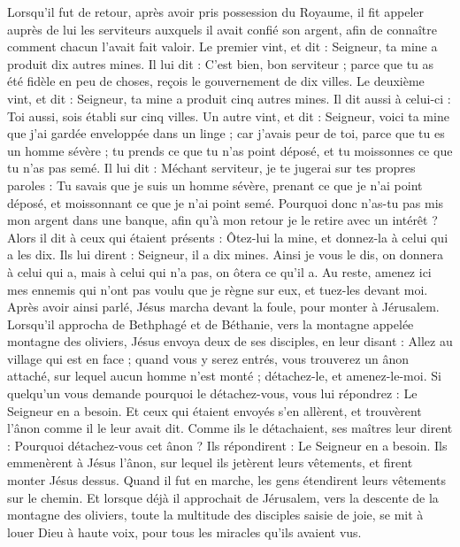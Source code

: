 \begin{multicols}{2}
{Lorsqu’il fut de retour, après avoir pris possession du Royaume, il fit appeler auprès de lui les serviteurs auxquels il avait confié son argent, afin de connaître comment chacun l’avait fait valoir.
Le premier vint, et dit : Seigneur, ta mine a produit dix autres mines.
Il lui dit : C’est bien, bon serviteur ; parce que tu as été fidèle en peu de choses, reçois le gouvernement de dix villes.
Le deuxième vint, et dit : Seigneur, ta mine a produit cinq autres mines.
Il dit aussi à celui-ci : Toi aussi, sois établi sur cinq villes.
Un autre vint, et dit : Seigneur, voici ta mine que j'ai gardée enveloppée dans un linge ;
car j’avais peur de toi, parce que tu es un homme sévère ; tu prends ce que tu n'as point déposé, et tu moissonnes ce que tu n'as pas semé.
Il lui dit : Méchant serviteur, je te jugerai sur tes propres paroles : Tu savais que je suis un homme sévère, prenant ce que je n'ai point déposé, et moissonnant ce que je n'ai point semé.
Pourquoi donc n'as-tu pas mis mon argent dans une banque, afin qu’à mon retour je le retire avec un intérêt ?
Alors il dit à ceux qui étaient présents : Ôtez-lui la mine, et donnez-la à celui qui a les dix.
Ils lui dirent : Seigneur, il a dix mines.
Ainsi je vous le dis, on donnera à celui qui a, mais à celui qui n’a pas, on ôtera ce qu’il a.
Au reste, amenez ici mes ennemis qui n'ont pas voulu que je règne sur eux, et tuez-les devant moi.
Après avoir ainsi parlé, Jésus marcha devant la foule, pour monter à Jérusalem.
Lorsqu’il approcha de Bethphagé et de Béthanie, vers la montagne appelée montagne des oliviers, Jésus envoya deux de ses disciples,
en leur disant : Allez au village qui est en face ; quand vous y serez entrés, vous trouverez un ânon attaché, sur lequel aucun homme n'est monté ; détachez-le, et amenez-le-moi.
Si quelqu'un vous demande pourquoi le détachez-vous, vous lui répondrez : Le Seigneur en a besoin.
Et ceux qui étaient envoyés s'en allèrent, et trouvèrent l'ânon comme il le leur avait dit.
Comme ils le détachaient, ses maîtres leur dirent : Pourquoi détachez-vous cet ânon ?
Ils répondirent : Le Seigneur en a besoin.
Ils emmenèrent à Jésus l'ânon, sur lequel ils jetèrent leurs vêtements, et firent monter Jésus dessus.
Quand il fut en marche, les gens étendirent leurs vêtements sur le chemin.
Et lorsque déjà il approchait de Jérusalem, vers la descente de la montagne des oliviers, toute la multitude des disciples saisie de joie, se mit à louer Dieu à haute voix, pour tous les miracles qu'ils avaient vus.
}
\end{multicols}
